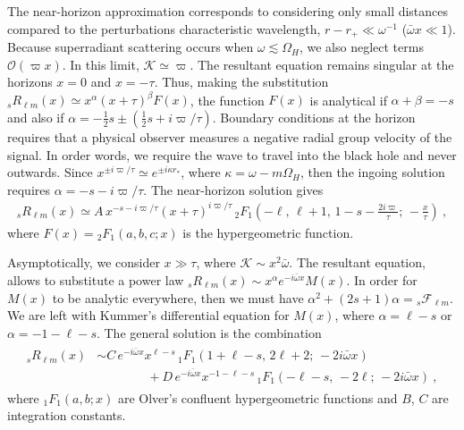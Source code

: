 The near-horizon approximation corresponds to considering only small distances compared to the perturbations characteristic wavelength, $r-r_{+} \ll \omega^{-1}$ ($\bar{\omega} x \ll 1$).
Because superradiant scattering occurs when $\omega\lesssim\Omega_H$, we also neglect terms $\mathscr{O}(\varpi x)$.
In this limit, $\mathscr{K}\simeq\varpi$.
The resultant equation remains singular at the horizons $x=0$ and $x=-\tau$. Thus, making the substitution ${}_{s}R_{\ell m}(x)\simeq x^\alpha (x+\tau)^\beta F(x)$, the function $F(x)$ is analytical if $\alpha+\beta=-s$ and also if $\alpha=-\tfrac{1}{2} s \pm \left(\tfrac{1}{2} s + i \varpi/\tau \right)$.
Boundary conditions at the horizon requires that a physical observer measures a negative radial group velocity of the signal.
In order words, we require the wave to travel into the black hole and never outwards.
Since $x^{\pm i \varpi/\tau} \simeq e^{\pm i \kappa r_{*}}$, where $\kappa=\omega - m \Omega_H$, then the ingoing solution requires $\alpha=-s-i\varpi/\tau$. The near-horizon solution gives
\begin{align}
    \label{eq3:RnearSolution}
    {}_{s}R_{\ell m}(x) \simeq A \, x^{-s-i\varpi/\tau} (x+\tau)^{i\varpi/\tau} \,{}_{2}F_1\left( -\ell, \,\ell+1, \,1-s-\frac{2i\varpi}{\tau}; \,-\frac{x}{\tau}\right) ~,
\end{align}
where $F(x)={}_{2}F_1(a,b,c; x)$ is the hypergeometric function.

Asymptotically, we consider $x\gg\tau$, where $\mathscr{K}\sim x^2 \bar{\omega}$. The resultant equation, 
allows to substitute a power law ${}_{s}R_{\ell m}(x)\sim x^\alpha e^{- i \bar{\omega} x} M(x)$. In order for $M(x)$ to be analytic everywhere, then we must have $\alpha^2+(2s+1)\alpha = {}_{s}\mathscr{F}_{\ell m}$. We are left with Kummer's differential equation for $M(x)$, where $\alpha = \ell-s$ or $\alpha=-1-\ell-s$. The general solution is the combination
\begin{align}
    \begin{split}
    {}_{s}R_{\ell m}(x) &\sim   C\,  e^{-i \bar{\omega} x} x^{\ell-s} \, {}_{1}F_1(1+\ell-s, \,2 \ell+2 ; \,-2 i \bar{\omega} x) \\
    &\qquad\qquad + D\,  e^{-i \bar{\omega} x} x^{-1-\ell-s} \, {}_{1}F_1(-\ell-s, \,-2 \ell; \,-2 i \bar{\omega} x) ~,
    \end{split}
    \label{eq3:RfarSolution}
\end{align}
where ${}_{1}F_1(a,b;x)$ are Olver's confluent hypergeometric functions and $B$, $C$ are integration constants.

